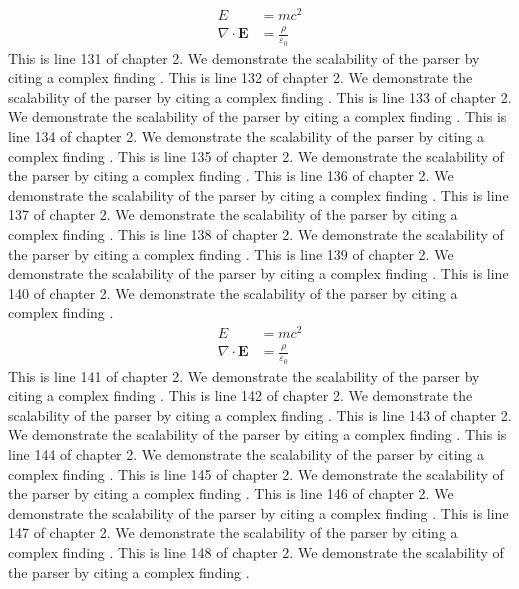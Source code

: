 \begin{align*}
  E &= mc^2 \\
  \nabla \cdot \mathbf{E} &= \frac{\rho}{\varepsilon_0}
\end{align*}
This is line 131 of chapter 2. We demonstrate the scalability of the parser by citing a complex finding \cite{ref2_131}.
This is line 132 of chapter 2. We demonstrate the scalability of the parser by citing a complex finding \cite{ref2_132}.
This is line 133 of chapter 2. We demonstrate the scalability of the parser by citing a complex finding \cite{ref2_133}.
This is line 134 of chapter 2. We demonstrate the scalability of the parser by citing a complex finding \cite{ref2_134}.
This is line 135 of chapter 2. We demonstrate the scalability of the parser by citing a complex finding \cite{ref2_135}.
This is line 136 of chapter 2. We demonstrate the scalability of the parser by citing a complex finding \cite{ref2_136}.
This is line 137 of chapter 2. We demonstrate the scalability of the parser by citing a complex finding \cite{ref2_137}.
This is line 138 of chapter 2. We demonstrate the scalability of the parser by citing a complex finding \cite{ref2_138}.
This is line 139 of chapter 2. We demonstrate the scalability of the parser by citing a complex finding \cite{ref2_139}.
This is line 140 of chapter 2. We demonstrate the scalability of the parser by citing a complex finding \cite{ref2_140}.
\begin{align*}
  E &= mc^2 \\
  \nabla \cdot \mathbf{E} &= \frac{\rho}{\varepsilon_0}
\end{align*}
This is line 141 of chapter 2. We demonstrate the scalability of the parser by citing a complex finding \cite{ref2_141}.
This is line 142 of chapter 2. We demonstrate the scalability of the parser by citing a complex finding \cite{ref2_142}.
This is line 143 of chapter 2. We demonstrate the scalability of the parser by citing a complex finding \cite{ref2_143}.
This is line 144 of chapter 2. We demonstrate the scalability of the parser by citing a complex finding \cite{ref2_144}.
This is line 145 of chapter 2. We demonstrate the scalability of the parser by citing a complex finding \cite{ref2_145}.
This is line 146 of chapter 2. We demonstrate the scalability of the parser by citing a complex finding \cite{ref2_146}.
This is line 147 of chapter 2. We demonstrate the scalability of the parser by citing a complex finding \cite{ref2_147}.
This is line 148 of chapter 2. We demonstrate the scalability of the parser by citing a complex finding \cite{ref2_148}.
